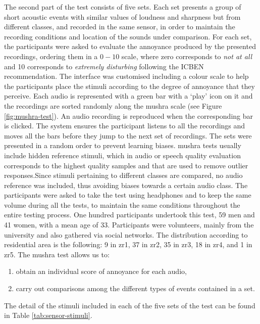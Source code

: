 The second part of the test consists of five sets. Each set presents a group of short acoustic events with similar values of loudness and sharpness but from different classes, and recorded in the same sensor, in order to maintain the recording conditions and location of the sounds under comparison. For each set, the participants were asked to evaluate the annoyance produced by the presented recordings, ordering them in a $0-10$ scale, where zero corresponds to \emph{not at all} and 10 corresponds to \emph{extremely disturbing} following the ICBEN recommendation. The interface was customised including a colour scale to help the participants place the stimuli according to the degree of annoyance that they perceive. Each audio is represented with a green bar with a `play' icon on it and the recordings are sorted randomly along the \gls{mushra} scale (see Figure \ref{fig:mushra-test}). An audio recording is reproduced when the corresponding bar is clicked. The system ensures the participant listens to all the recordings and moves all the bars before they jump to the next set of recordings. The sets were presented in a random order to prevent learning biases. \gls{mushra} tests usually include hidden reference stimuli, which in audio or speech quality evaluation corresponds to the highest quality samples and that are used to remove outlier responses.Since stimuli pertaining to different classes are compared, no audio reference was included, thus avoiding biases towards a certain audio class. The participants were asked to take the test using headphones and to keep the same volume during all the tests, to maintain the same conditions throughout the entire testing process. One hundred participants undertook this test, 59 men and 41 women, with a mean age of 33. Participants were volunteers, mainly from the university and also gathered via social networks. The distribution according to residential area is the following: 9 in zr1, 37 in zr2, 35 in zr3, 18 in zr4, and 1 in zr5. The \gls{mushra} test allows us to:

\begin{enumerate}
  \item obtain an individual score of annoyance for each audio,
  \item carry out comparisons among the different types of events contained in a set.
\end{enumerate}

The detail of the stimuli included in each of the five sets of the test can be found in Table \ref{tab:sensor-stimuli}.

